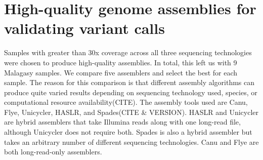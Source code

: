 
\section{High-quality genome assemblies for validating variant calls}
\label{sec:asm_results}

Samples with greater than 30x coverage across all three sequencing technologies were chosen to produce high-quality assemblies. In total, this left us with 9 Malagasy samples. We compare five assemblers and select the best for each sample. The reason for this comparison is that different assembly algorithms can produce quite varied results depending on sequencing technology used, species, or computational resource availability(CITE).  
The assembly tools used are Canu, Flye, Unicycler, HASLR, and Spades(CITE \& VERSION). HASLR and Unicycler are hybrid assemblers that take Illumina reads along with one long-read file, although Unicycler does not require both. Spades is also a hybrid assembler but takes an arbitrary number of different sequencing technologies. Canu and Flye are both long-read-only assemblers.

